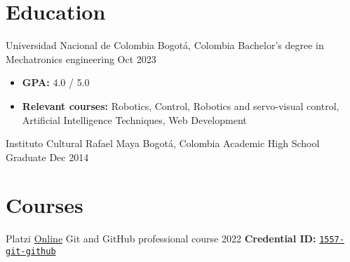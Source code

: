 \section*{Education}
\begin{entrylist}
    \entry
    {Universidad Nacional de Colombia}
    {Bogotá, Colombia}
    {Bachelor’s degree in Mechatronics engineering }
    {Oct 2023}
    {\begin{itemize}
            \item \textbf{GPA:} 4.0 / 5.0
            \item \textbf{Relevant courses:} Robotics, Control, Robotics and servo-visual control, Artificial Intelligence Techniques, Web Development%
        \end{itemize}
    }

    \entry
    {Instituto Cultural Rafael Maya}
    {Bogotá, Colombia}
    {Academic High School Graduate}
    {Dec 2014}
    {}
\end{entrylist}

\section*{Courses}
\begin{entrylist}
    \entry
    {Platzi}
    {\href{https://platzi.com/cursos/git-github/}{Online}}
    {Git and GitHub professional course}
    {2022}
    {%
        \textbf{Credential ID:} \href{https://platzi.com/p/cychitivav/curso/1557-git-github/diploma/detalle/}{\texttt{1557-git-github}}
    }
\end{entrylist}